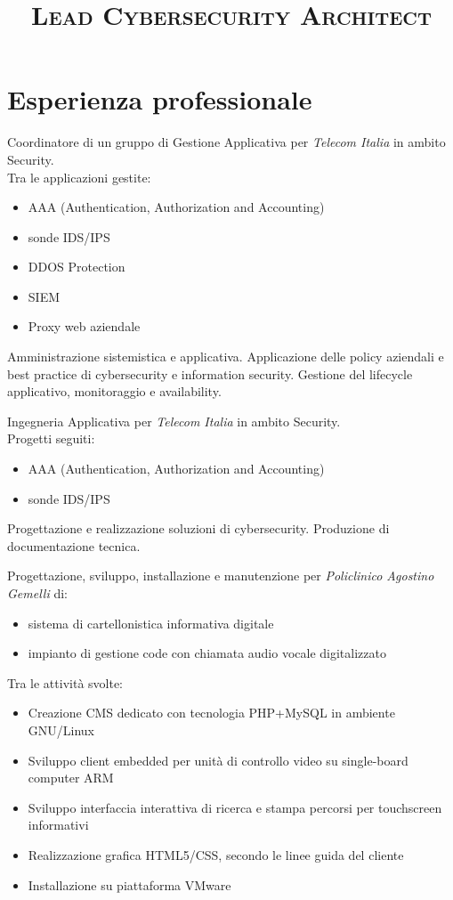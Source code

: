 \documentclass[a4paper, 11pt]{moderncv}
\title{\Large{\textsc{Lead Cybersecurity \break Architect}}}
\begin{document}
\makecvtitle

\section{Esperienza professionale}
        {Coordinatore di un gruppo di Gestione Applicativa per \emph{Telecom Italia} in ambito Security.\\ Tra le applicazioni gestite: \begin{itemize}
          \item AAA (Authentication, Authorization and Accounting)
          \item sonde IDS/IPS
          \item DDOS Protection
          \item SIEM
          \item Proxy web aziendale
          \end{itemize}
          Amministrazione sistemistica e applicativa. Applicazione delle policy aziendali e best practice di cybersecurity e information security. Gestione del lifecycle applicativo, monitoraggio e availability.}
\vspace{3mm}
        {Ingegneria Applicativa per \emph{Telecom Italia} in ambito Security. \\ Progetti seguiti:
          \begin{itemize}
          \item AAA (Authentication, Authorization and Accounting)
          \item sonde IDS/IPS
        \end{itemize}
        Progettazione e realizzazione soluzioni di cybersecurity. Produzione di documentazione tecnica.}
\vspace{3mm}
        {Progettazione, sviluppo, installazione e manutenzione per \emph{Policlinico Agostino Gemelli} di:
          \begin{itemize}
          \item  sistema di cartellonistica informativa digitale
          \item  impianto di gestione code con chiamata audio vocale digitalizzato
          \end{itemize}
          Tra le attività svolte:
          \begin{itemize}
          \item Creazione CMS dedicato con tecnologia PHP+MySQL in ambiente GNU/Linux
          \item Sviluppo client embedded per unità di controllo video su single-board computer ARM
          \item Sviluppo interfaccia interattiva di ricerca e stampa percorsi per touchscreen informativi
          \item Realizzazione grafica HTML5/CSS, secondo le linee guida del cliente
          \item Installazione su piattaforma VMware
          \end{itemize}}
\end{document}
